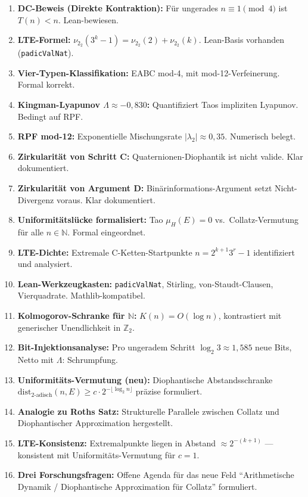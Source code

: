 \documentclass[12pt,a4paper]{article}
\newcommand{\vii}{\nu_2}
\newcommand{\N}{\mathbb{N}}
\newcommand{\Ztwo}{\mathbb{Z}_2}
\newcommand{\KC}{K}    %
\begin{document}
\begin{tcolorbox}[ergebnis, title={Mathematische Bilanz (Stand: Juni 2026)}]
\begin{enumerate}[label=\textbf{\arabic*.}, leftmargin=*, align=left, nosep,
    itemsep=2pt]
  \item[\checkmark] \textbf{DC-Beweis (Direkte Kontraktion):}
    Für ungerades $n \equiv 1 \pmod{4}$ ist $T(n) < n$. Lean-bewiesen.
  \item[\checkmark] \textbf{LTE-Formel:} $\vii_2(3^k - 1) = \vii_2(2) + \vii_2(k)$.
    Lean-Basis vorhanden (\texttt{padicValNat}).
  \item[\checkmark] \textbf{Vier-Typen-Klassifikation:} EABC mod-4, mit
    mod-12-Verfeinerung. Formal korrekt.
  \item[\checkmark] \textbf{Kingman-Lyapunov $\Lambda \approx -0{,}830$:}
    Quantifiziert Taos impliziten Lyapunov. Bedingt auf RPF.
  \item[\checkmark] \textbf{RPF mod-12:} Exponentielle Mischungsrate
    $|\lambda_2| \approx 0{,}35$. Numerisch belegt.
  \item[\checkmark] \textbf{Zirkularität von Schritt C:} Quaternionen-Diophantik
    ist nicht valide. Klar dokumentiert.
  \item[\checkmark] \textbf{Zirkularität von Argument D:} Binärinformations-Argument
    setzt Nicht-Divergenz voraus. Klar dokumentiert.
  \item[\checkmark] \textbf{Uniformitätslücke formalisiert:} Tao $\mu_H(E)=0$
    vs.\ Collatz-Vermutung für alle $n \in \N$. Formal eingeordnet.
  \item[\checkmark] \textbf{LTE-Dichte:} Extremale C-Ketten-Startpunkte
    $n = 2^{k+1} 3^r - 1$ identifiziert und analysiert.
  \item[\checkmark] \textbf{Lean-Werkzeugkasten:} \texttt{padicValNat},
    Stirling, von-Staudt-Clausen, Vierquadrate. Mathlib-kompatibel.
  \item[\checkmark] \textbf{Kolmogorov-Schranke für $\N$:}
    $\KC(n) = O(\log n)$, kontrastiert mit generischer Unendlichkeit in $\Ztwo$.
  \item[\checkmark] \textbf{Bit-Injektionsanalyse:} Pro ungeradem Schritt
    $\log_2 3 \approx 1{,}585$ neue Bits, Netto mit $\Lambda$: Schrumpfung.
  \item[\checkmark] \textbf{Uniformitäts-Vermutung (neu):}
    Diophantische Abstandsschranke $\mathrm{dist}_{2\text{-adisch}}(n, E)
    \geq c \cdot 2^{-\lfloor\log_2 n\rfloor}$ präzise formuliert.
  \item[\checkmark] \textbf{Analogie zu Roths Satz:} Strukturelle Parallele
    zwischen Collatz und Diophantischer Approximation hergestellt.
  \item[\checkmark] \textbf{LTE-Konsistenz:} Extremalpunkte liegen in
    Abstand $\approx 2^{-(k+1)}$ --- konsistent mit Uniformitäts-Vermutung
    für $c = 1$.
  \item[\checkmark] \textbf{Drei Forschungsfragen:} Offene Agenda für
    das neue Feld ``Arithmetische Dynamik / Diophantische Approximation
    für Collatz'' formuliert.
\end{enumerate}
\end{tcolorbox}
\end{document}
